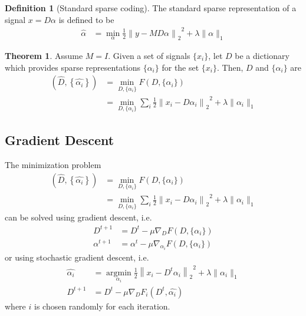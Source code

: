 \documentclass[titlepage, fleqn, a4paper, 12pt, twoside]{article}
\theoremstyle{definition}
\newtheorem{definition}{Definition}
\theoremstyle{theorem}
\newtheorem{theorem}{Theorem}
\DeclareMathOperator{\argmin}{\mathrm{argmin}}
\begin{document}
\begin{definition}[Standard sparse coding]
	The standard sparse representation of a signal $x = D \alpha$ is defined to be
	\begin{align*}
		\hat{\alpha} &= \min\limits_{\alpha} \frac{1}{2} {\left\| y - M D \alpha \right\|_2}^2 + \lambda \|\alpha\|_1
	\end{align*}
\end{definition}

\begin{theorem}
	Assume $M = I$.
	Given a set of signals $\{x_i\}$, let $D$ be a dictionary which provides sparse representations $\{\alpha_i\}$ for the set $\{x_i\}$.
	Then, $D$ and $\{\alpha_i\}$ are
	\begin{align*}
		\left( \hat{D},\left\{ \hat{\alpha_i}\right \} \right) &= \min\limits_{D,\{\alpha_i\}} F\left( D , \{\alpha_i\} \right)\\
		&= \min\limits_{D,\{\alpha_i\}} \sum\limits_{i} \frac{1}{2} {\left\| x_i - D \alpha_i \right\|_2}^2 + \lambda \|\alpha_i\|_1
	\end{align*}
\end{theorem}

\subsection{Gradient Descent}

The minimization problem
\begin{align*}
	\left( \hat{D},\left\{ \hat{\alpha_i}\right \} \right) &= \min\limits_{D,\{\alpha_i\}} F\left( D , \{\alpha_i\} \right)\\
	&= \min\limits_{D,\{\alpha_i\}} \sum\limits_{i} \frac{1}{2} {\left\| x_i - D \alpha_i \right\|_2}^2 + \lambda \|\alpha_i\|_1
\end{align*}
can be solved using gradient descent, i.e.
\begin{align*}
	D^{t + 1} &= D^t - \mu \nabla_D F\left( D , \{\alpha_i\} \right)\\
	\alpha^{t + 1} &= \alpha^t - \mu \nabla_{\alpha_i} F\left( D , \{\alpha_i\} \right)
\end{align*}
or using stochastic gradient descent, i.e.
\begin{align*}
	\hat{\alpha_i} &= \argmin\limits_{\alpha_i} \frac{1}{2} {\left\| x_i - D^t \alpha_i \right\|_2}^2 + \lambda \|\alpha_i\|_1\\
	D^{t + 1} &= D^t - \mu \nabla_D F_i\left( D^t , \hat{\alpha_i} \right)
\end{align*}
where $i$ is chosen randomly for each iteration.
\end{document}
